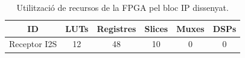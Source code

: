 \begin{table}[H]
    \centering
    \begin{tabular}{ | c | c | c | c | c | c |}
    \hline
    \centering
    \textbf{ID}     &  \textbf{LUTs} & \textbf{Registres}  & \textbf{Slices} & \textbf{Muxes}  & \textbf{DSPs} \\ [2ex] \hline
    \centering
    Receptor I2S    &  12 & 48  & 10 & 0  & 0 \\ \hline
    \end{tabular}
    \caption{Utilització de recursos de la FPGA pel bloc IP dissenyat.}
    \label{taularecursosI2S}
\end{table}

  